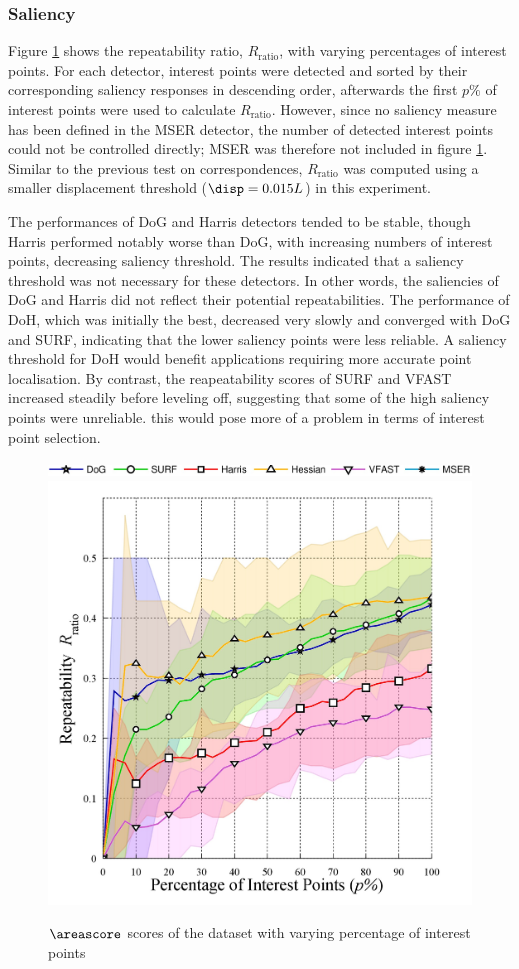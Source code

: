 \subsubsection{Saliency}

Figure \ref{fig/eval/graph_keypointnum} shows the repeatability ratio, $R_\textrm{ratio}$, with varying percentages of interest points. For each detector, interest points were detected and sorted by their corresponding saliency responses in descending order, afterwards the first $p\%$ of interest points were used to calculate $R_\mathrm{ratio}$. However, since no saliency measure has been defined in the MSER detector, the number of detected interest points could not be controlled directly; MSER was therefore not included in figure \ref{fig/eval/graph_keypointnum}. Similar to the previous test on correspondences, $R_\textrm{ratio}$ was computed using a smaller displacement threshold ($\disp = 0.015L$) in this experiment.   

The performances of DoG and Harris detectors tended to be stable, though Harris performed notably worse than DoG, with increasing numbers of interest points, \ie decreasing saliency threshold. The results indicated that a saliency threshold was not necessary for these detectors. In other words, the saliencies of DoG and Harris did not reflect their potential repeatabilities. The performance of DoH, which was initially the best, decreased very slowly and converged with DoG and SURF, indicating that the lower saliency points were less reliable. A saliency threshold for DoH would benefit applications requiring more accurate point localisation. By contrast, the reapeatability scores of SURF and VFAST increased steadily before leveling off, suggesting that some of the high saliency points were unreliable. this would pose more of a problem in terms of interest point selection. 

\begin{figure}[ht]
	\centering
	\includegraphics[width=0.70\linewidth]{./fig/eval/hlegend.jpg} \\ 
	\includegraphics[width=0.48\linewidth]{./fig/eval/graph_keypointnum.jpg}
	\caption{$\areascore$ scores of the \meshset dataset with varying percentage of interest points}
	\label{fig/eval/graph_keypointnum}	
\end{figure}

